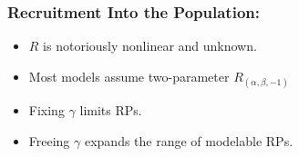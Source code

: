 \documentclass[a0paper,portrait]{baposter}
\begin{document}
\begin{poster}
{\begin{minipage}[h!]{0.55\textwidth}
	\subsubsection*{Recruitment Into the Population:}
        \begin{minipage}[b]{0.5\textwidth}
	\begin{itemize}[leftmargin=*]
		\raggedright	
		\item $R$ is notoriously nonlinear and unknown.%
		\item Most models assume two-parameter $R_{(\alpha, \beta, -1)}$ 
		\item Fixing $\gamma$ limits RPs.\\
		\item Freeing $\gamma$ expands the range of modelable RPs.	
	\end{itemize}
	$~$\\$~$\\$~$\\$~$\\
	\end{minipage}
	\begin{minipage}[b]{0.48\textwidth}
		$~$\\

\end{minipage}
\end{minipage}}
\end{poster}
\end{document}
